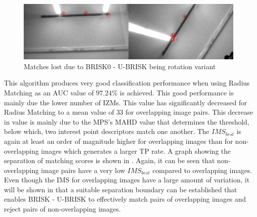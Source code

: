 \documentclass[11pt]{report}
\begin{document}
\begin{figure}
  \centering
    \includegraphics[width=1.0\textwidth]{../Drawings/Matching/rotationsUBRISK.jpg}
    \caption{Matches lost due to BRISK0 - U-BRISK being rotation variant} 
    \label{fig:rotationUbrisk}
\end{figure}


This algorithm produces very good classification performance when using Radius Matching as an AUC value of $97.24\%$ is achieved. This good performance is mainly due the lower number of IZMs. This value has significantly decreased for Radius Matching to a mean value of $33$ for overlapping image pairs. This decrease in value is mainly due to the MPS's MAHD value that determines the threshold, below which, two interest point descriptors match one another. The $IMS_{best}$ is again at least an order of magnitude higher for overlapping images than for non-overlapping images which generates a larger TP rate. A graph showing the separation of matching scores is shown in . Again, it can be seen that non-overlapping image pairs have a very low $IMS_{best}$ compared to overlapping images. Even though the IMS for overlapping images have a large amount of variation, it will be shown in  that a suitable separation boundary can be established that enables BRISK - U-BRISK to effectively match pairs of overlapping images and reject pairs of non-overlapping images.\\
\end{document}
